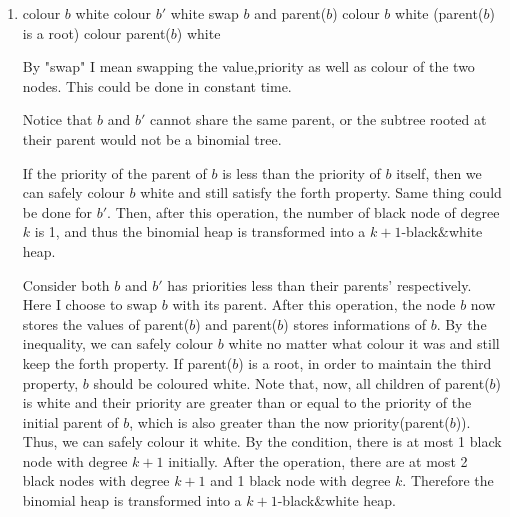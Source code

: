 \documentclass[10pt]{article}
\begin{document}
\begin{enumerate}
	\item
	\begin{comment}
		Suppose you have a linked-list H of binomial trees that satisfies all
		the properties of a black$&$white heap except that it has two black nodes
		$b$ and $b'$ of degree k both of which have parents of degree $k+1$.
		Given pointers to $b$ and $b'$, explain how to transform H in constant
		time into a k'-black$&$white heap with the same set of nodes, for some
		$k' > k$.
	\end{comment}
		
		\begin{algorithmic}[1]
				\State colour $b$ white
				\State colour $b'$ white
			\Else
				\State swap $b$ and parent($b$)
				\State colour $b$ white
				\If(parent($b$) is a root)
					\State colour parent($b$) white
				\EndIf
			\EndIf
		\end{algorithmic}

		By "swap" I mean swapping the value,priority as well as colour of the
		two nodes. 
		This could be done in constant time.

		Notice that $b$ and $b'$ cannot share the same parent, or the
		subtree rooted at their parent would not be a binomial tree.

		If the priority of the parent of $b$ is less than the priority of $b$
		itself, then we can safely colour $b$ white and still satisfy the
		forth property. 
		Same thing could be done for $b'$.
		Then, after this operation, the number of black node of degree $k$ is
		1, and thus the binomial heap is transformed into a $k+1$-black$\&$white
		heap.

		Consider both $b$ and $b'$ has priorities less than their parents'
		respectively.
		Here I choose to swap $b$ with its parent.
		After this operation, the node $b$ now stores the values of parent($b$)
		and parent($b$) stores informations of $b$.
		By the inequality, we can safely colour $b$ white no matter what colour
		it was and still keep the forth property.
		If parent($b$) is a root, in order to maintain the third property, $b$
		should be coloured white. 
		Note that, now, all children of parent($b$) is white and their priority
		are	greater than or equal to the priority of the initial parent of $b$, 
		which is also greater than the now priority(parent($b$)). 
		Thus, we can safely colour it white.
		By the condition, there is at most 1 black node with degree $k+1$
		initially.
		After the operation, there are at most 2 black nodes with degree $k+1$
		and 1 black node with degree $k$.
		Therefore the binomial heap is transformed into a $k+1$-black$\&$white
		heap.


\end{enumerate}
\end{document}
